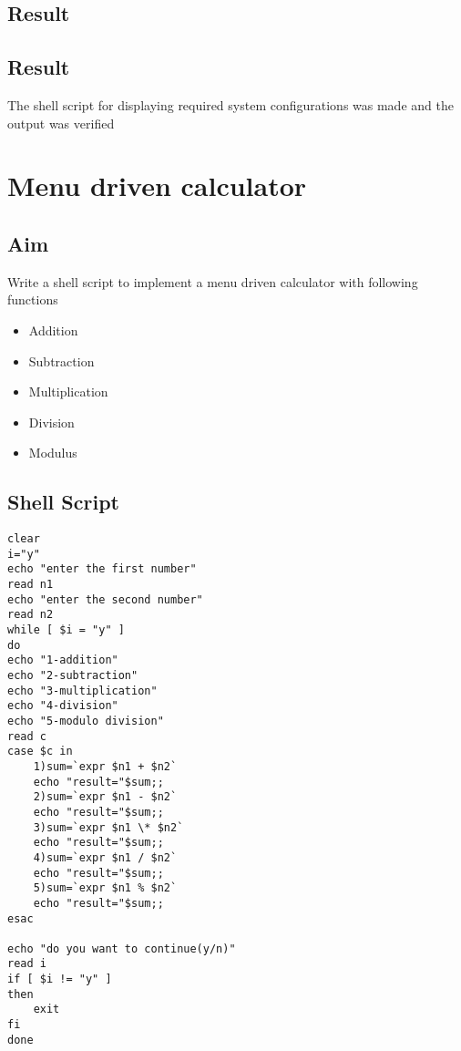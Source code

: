 \documentclass{article}
\begin{document}
\subsection{Result}

\subsection{Result}
The shell script for displaying required system configurations was made and the output was verified

\begin{refsection}
\cite{shellbible}
\cite{shellbook}
\printbibliography
\end{refsection}

\newpage

\section{Menu driven calculator}
\subsection{Aim}
Write a shell script to implement a menu driven calculator with following functions
\begin{itemize}

\item Addition
\item Subtraction
\item Multiplication
\item Division
\item Modulus

\end{itemize}

\subsection{Shell Script}

\begin{verbatim}
clear 
i="y"
echo "enter the first number"
read n1
echo "enter the second number"
read n2
while [ $i = "y" ]
do
echo "1-addition"
echo "2-subtraction"
echo "3-multiplication"
echo "4-division"
echo "5-modulo division"
read c
case $c in 
	1)sum=`expr $n1 + $n2`
	echo "result="$sum;;
	2)sum=`expr $n1 - $n2`
    echo "result="$sum;;
	3)sum=`expr $n1 \* $n2`
    echo "result="$sum;;
	4)sum=`expr $n1 / $n2`
    echo "result="$sum;;
    5)sum=`expr $n1 % $n2`
    echo "result="$sum;;
esac

echo "do you want to continue(y/n)"
read i
if [ $i != "y" ]
then 
	exit
fi
done
\end{verbatim}
\end{document}
